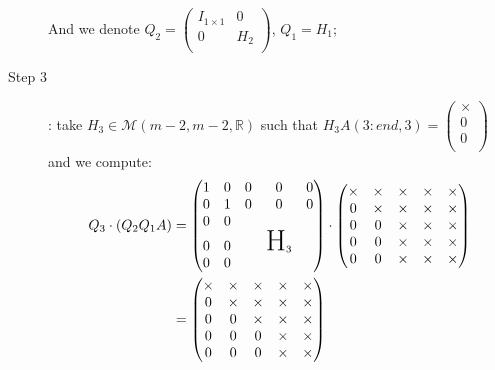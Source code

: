 \documentclass[computational_mathematics.tex]{subfiles}
\begin{document}
\begin{example}
\begin{description}
    And we denote $Q_{2} =\begin{pmatrix}
        I_{1 \times 1} & 0\\
        0 & H_{2}\\
      \end{pmatrix}$, $Q_{1}=H_1$;
  \item[{\sc Step 3}]: take $H_{3} \in \mathcal{M}(m-2, m-2, \mathds{R})$ such that $H_{3}A(3:end, 3) = \begin{pmatrix} \times\\ 0\\ 0\\ \end{pmatrix}$
      and we compute:
      \begin{equation}
        \begin{aligned}
          Q_3 \cdot (Q_2 Q_1 A)
          &=  \begin{pmatrix}
          1 & 0 & 0 & 0 & 0\\
          0 & 1 & 0 & 0 & 0\\
          0 & 0 & & \\
          0 & 0 && \text{\huge H}_3\\
          0 & 0 &&\\
        \end{pmatrix} \cdot  \begin{pmatrix}
          \times & \times & \times & \times & \times\\
          0 & \times & \times & \times & \times\\
          0 & 0 & \times & \times & \times\\
          0 & 0 & \times & \times & \times\\
          0 & 0 & \times & \times & \times\\
        \end{pmatrix}\\
        &= \begin{pmatrix}
          \times & \times & \times & \times & \times\\
          0 & \times & \times & \times & \times\\
          0 & 0 & \times & \times & \times\\
          0 & 0 & 0 & \times & \times\\
          0 & 0 & 0 & \times & \times\\
        \end{pmatrix}
        \end{aligned}
      \end{equation}


\end{description}
\end{example}
\end{document}
